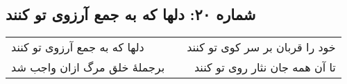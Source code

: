 \begin{center}
\section*{شماره ۲۰: دلها که به جمع آرزوی تو کنند}
\label{sec:020}
\begin{longtable}{l p{0.5cm} r}
دلها که به جمع آرزوی تو کنند
&&
خود را قربان بر سر کوی تو کنند
\\
برجملهٔ خلق مرگ ازان واجب شد
&&
تا آن همه جان نثار روی تو کنند
\\
\end{longtable}
\end{center}
